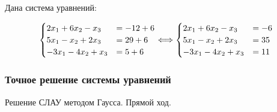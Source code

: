 \documentclass[10pt, a4paper, titlepage]{article}
\begin{document}
Дана система уравнений:

\begin{equation*}
    \begin{cases}
        $$2x_1+6x_2-x_3 &= -12+6$$ \\
        $$5x_1-x_2+2x_3 &= 29+6$$ \\
        $$-3x_1-4x_2+x_3 &= 5+6$$
    \end{cases}
    \Longleftrightarrow
    \begin{cases}
        $$2x_1+6x_2-x_3 &= -6$$ \\
        $$5x_1-x_2+2x_3 &= 35$$ \\
        $$-3x_1-4x_2+x_3 &= 11$$
    \end{cases}
\end{equation*}


\subsubsection*{Точное решение системы уравнений}

Решение СЛАУ методом Гаусса. Прямой ход.
\end{document}
